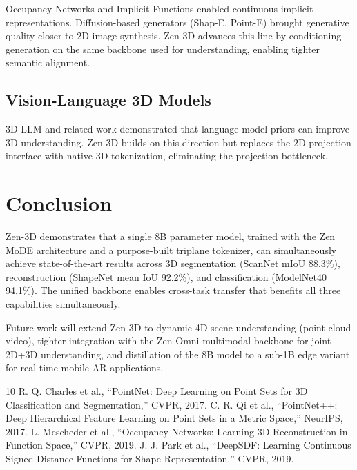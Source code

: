 \documentclass[11pt,a4paper]{article}
\begin{document}
Occupancy Networks \cite{mescheder2019occupancy} and Implicit Functions \cite{park2019deepsdf}
enabled continuous implicit representations. Diffusion-based generators (Shap-E, Point-E) brought
generative quality closer to 2D image synthesis. Zen-3D advances this line by conditioning
generation on the same backbone used for understanding, enabling tighter semantic alignment.

\subsection{Vision-Language 3D Models}

3D-LLM and related work demonstrated that language model priors can improve 3D understanding.
Zen-3D builds on this direction but replaces the 2D-projection interface with native 3D
tokenization, eliminating the projection bottleneck.

\section{Conclusion}

Zen-3D demonstrates that a single 8B parameter model, trained with the Zen MoDE architecture
and a purpose-built triplane tokenizer, can simultaneously achieve state-of-the-art results
across 3D segmentation (ScanNet mIoU 88.3\%), reconstruction (ShapeNet mean IoU 92.2\%), and
classification (ModelNet40 94.1\%). The unified backbone enables cross-task transfer that
benefits all three capabilities simultaneously.

Future work will extend Zen-3D to dynamic 4D scene understanding (point cloud video), tighter
integration with the Zen-Omni multimodal backbone for joint 2D+3D understanding, and
distillation of the 8B model to a sub-1B edge variant for real-time mobile AR applications.

\begin{thebibliography}{10}
 R. Q. Charles et al., ``PointNet: Deep Learning on Point Sets for 3D Classification and Segmentation,'' CVPR, 2017.
 C. R. Qi et al., ``PointNet++: Deep Hierarchical Feature Learning on Point Sets in a Metric Space,'' NeurIPS, 2017.
 L. Mescheder et al., ``Occupancy Networks: Learning 3D Reconstruction in Function Space,'' CVPR, 2019.
 J. J. Park et al., ``DeepSDF: Learning Continuous Signed Distance Functions for Shape Representation,'' CVPR, 2019.
\end{thebibliography}
\end{document}
